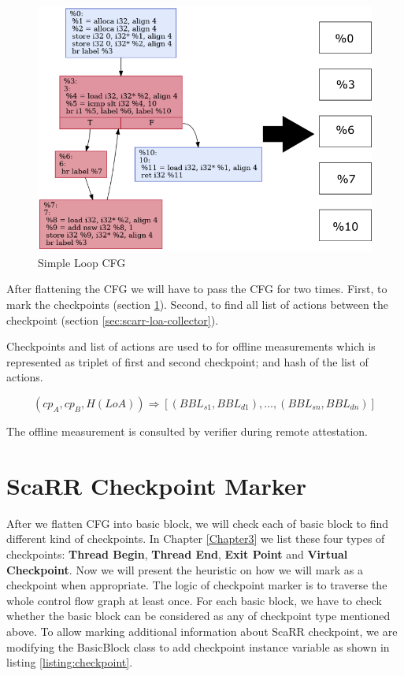 \begin{figure}[htbp]
\centerline{\includegraphics[scale=.70]{Figures/04/flatten-cfg.png}}
\caption{Simple Loop CFG}
\label{fig:simple-loop-cfg}
\end{figure}

After flattening the CFG we will have to pass the CFG for two times. First, to
mark the checkpoints (section \ref{sec:scarr-checkpoint-marker}). Second, to
find all list of actions between the checkpoint (section
\ref{sec:scarr-loa-collector}).

Checkpoints and list of actions are used to for offline measurements which is
represented as triplet of first and second checkpoint; and hash of the list of
actions.

$$(cp_A, cp_B, H(LoA)) \Rightarrow [(BBL_{s1}, BBL_{d1}), ..., (BBL_{sn},
BBL_{dn})]$$

The offline measurement is consulted by verifier during remote attestation.

\section{ScaRR Checkpoint Marker} 
\label{sec:scarr-checkpoint-marker}

After we flatten CFG into basic block, we will check each of basic block to find
different kind of checkpoints. In Chapter \ref{Chapter3} we list these four
types of checkpoints: \textbf{Thread Begin}, \textbf{Thread End}, \textbf{Exit
Point} and \textbf{Virtual Checkpoint}. Now we will present the heuristic on how
we will mark as a checkpoint when appropriate.  The logic of checkpoint marker
is to traverse the whole control flow graph at least once. For each basic block,
we have to check whether the basic block can be considered as any of checkpoint
type mentioned above. To allow marking additional information about ScaRR
checkpoint, we are modifying the BasicBlock class to add checkpoint instance
variable as shown in listing \ref{listing:checkpoint}.

